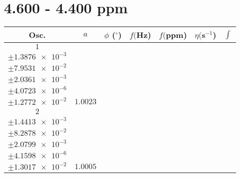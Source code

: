 \documentclass[8pt]{article}
\begin{document}
\section*{4.600 - 4.400 ppm}
\begin{longtable}[l]{c c c c c c c}
\toprule
Osc. & $a$ & $\phi$ ($^{\circ}$) & $f ($Hz) & $f ($ppm) & $\eta ($s$^{-1}$) & $\int$\\
\midrule
$\num{1}$ & \begin{tabular}[c]{@{}c@{}}$\num{1.0004}$ \\ $\pm\num{1.3876e-3}$\end{tabular} & \begin{tabular}[c]{@{}c@{}}$\num{8.2802e-2}$ \\ $\pm\num{7.9531e-2}$\end{tabular} & \begin{tabular}[c]{@{}c@{}}$\num{2.2344e+3}$ \\ $\pm\num{2.0361e-3}$\end{tabular} & \begin{tabular}[c]{@{}c@{}}$\num{4.4688}$ \\ $\pm\num{4.0723e-6}$\end{tabular} & \begin{tabular}[c]{@{}c@{}}$\num{6.9995}$ \\ $\pm\num{1.2772e-2}$\end{tabular} & $\num{1.0023}$\\
$\num{2}$ & \begin{tabular}[c]{@{}c@{}}$\num{0.99842}$ \\ $\pm\num{1.4413e-3}$\end{tabular} & \begin{tabular}[c]{@{}c@{}}$\num{2.5957e-2}$ \\ $\pm\num{8.2878e-2}$\end{tabular} & \begin{tabular}[c]{@{}c@{}}$\num{2.243e+3}$ \\ $\pm\num{2.0799e-3}$\end{tabular} & \begin{tabular}[c]{@{}c@{}}$\num{4.486}$ \\ $\pm\num{4.1598e-6}$\end{tabular} & \begin{tabular}[c]{@{}c@{}}$\num{6.9913}$ \\ $\pm\num{1.3017e-2}$\end{tabular} & $\num{1.0005}$\\

\end{longtable}
\end{document}
